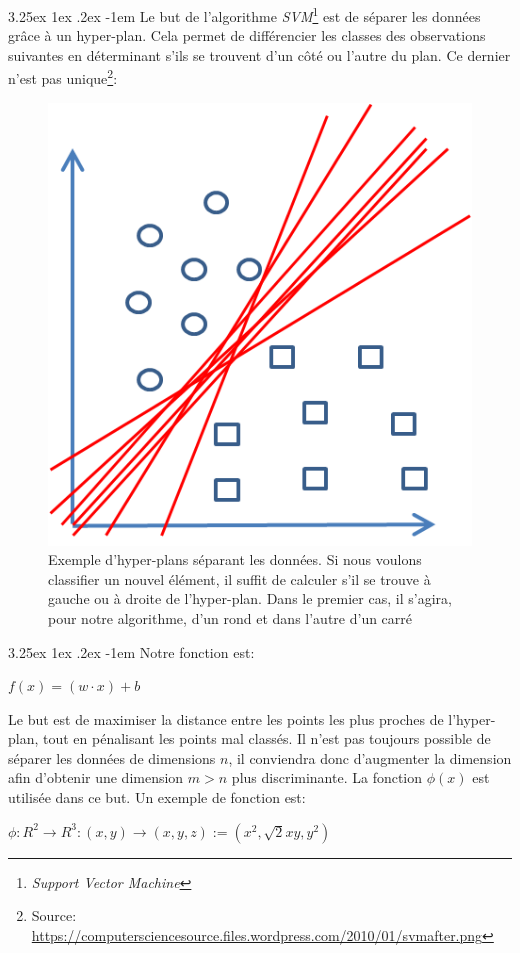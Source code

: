 \documentclass[a4paper, 11pt]{article}
\makeatletter
\renewcommand\paragraph{\@startsection{paragraph}{5}{\z@}%
  {3.25ex \@plus1ex \@minus.2ex}%
  {-1em}%
  {\normalfont\normalsize\bfseries}}
\makeatother
\begin{document}
\paragraph{}
Le but de l'algorithme \textit{SVM}\footnote{\textit{Support Vector Machine}} est de séparer les données grâce à un hyper-plan.
Cela permet de différencier les classes des observations suivantes en déterminant s'ils se trouvent d'un côté ou l'autre 
du plan. Ce dernier n'est pas unique\footnote{Source: \url{https://computersciencesource.files.wordpress.com/2010/01/svmafter.png}}: 
\begin{figure}[H]
\centering
\includegraphics{images/svm_exemple}
\caption{Exemple d'hyper-plans séparant les données. Si nous voulons classifier un nouvel élément, 
il suffit de calculer s'il se trouve à gauche ou à droite de l'hyper-plan. Dans le premier cas, il s'agira, 
pour notre algorithme, d'un rond et dans l'autre d'un carré}
\end{figure}

\paragraph{}
Notre fonction est:
\begin{center}
$f(x) = (w \cdot x) + b$
\end{center}
Le but est de maximiser la distance entre les points les plus proches de l'hyper-plan, tout en pénalisant 
les points mal classés. Il n'est pas toujours possible de séparer les données de dimensions $n$, 
il conviendra donc d'augmenter la dimension afin d'obtenir une dimension $m > n$ plus discriminante. 
La fonction $\phi(x)$ est utilisée dans ce but. Un exemple de fonction est:
\begin{center}
$\phi: R^2 \rightarrow R^3 :(x, y) \rightarrow (x, y, z):= (x^2, \sqrt{2}x y, y^2)$
\end{center}
\end{document}
